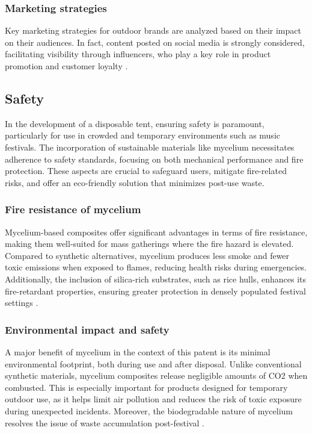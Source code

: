 \documentclass{article}
\begin{document}
\subsubsection{Marketing strategies}
Key marketing strategies for outdoor brands are analyzed based on their impact on their
audiences. In fact, content posted on social media is strongly considered, facilitating
visibility through influencers, who play a key role in product promotion and customer
loyalty \parencite{guestcolumn2024}.

\subsection{Safety}
In the development of a disposable tent, ensuring safety is paramount, particularly for
use in crowded and temporary environments such as music festivals. The incorporation of
sustainable materials like mycelium necessitates adherence to safety standards, focusing
on both mechanical performance and fire protection. These aspects are crucial to safeguard
users, mitigate fire-related risks, and offer an eco-friendly solution that minimizes
post-use waste.

\subsubsection{Fire resistance of mycelium}
Mycelium-based composites offer significant advantages in terms of fire resistance, making
them well-suited for mass gatherings where the fire hazard is elevated. Compared to
synthetic alternatives, mycelium produces less smoke and fewer toxic emissions when
exposed to flames, reducing health risks during emergencies. Additionally, the inclusion
of silica-rich substrates, such as rice hulls, enhances its fire-retardant properties,
ensuring greater protection in densely populated festival settings
\parencite{jonesThermalDegradationFire2018}.

\subsubsection{Environmental impact and safety}
A major benefit of mycelium in the context of this patent is its minimal environmental
footprint, both during use and after disposal. Unlike conventional synthetic materials,
mycelium composites release negligible amounts of CO2 when combusted. This is especially
important for products designed for temporary outdoor use, as it helps limit air pollution
and reduces the risk of toxic exposure during unexpected incidents. Moreover, the
biodegradable nature of mycelium resolves the issue of waste accumulation post-festival
\parencite{madusankaReviewRecentAdvances2024}.
\end{document}
